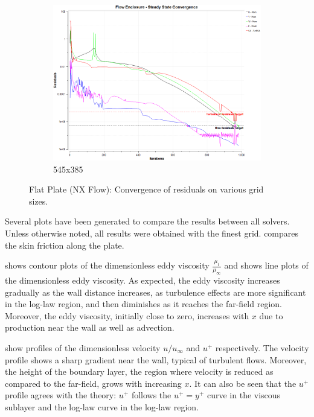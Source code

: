 \begin{figure}[ht!]
\begin{subfigure}{0.48\textwidth}
        \includegraphics[width=\textwidth]{./figs/flatnx/545x385_conv.png}
        \caption{545x385}
    \end{subfigure}
    \caption{Flat Plate (NX Flow): Convergence of residuals on various grid sizes.}
    \label{fig:nxflatcnvstudy}
\end{figure}

Several plots have been generated to compare the results between all solvers. Unless otherwise noted, all results were obtained with the finest grid.  compares the skin friction along the plate.

 shows contour plots of the dimensionless eddy viscosity $\frac{\mu_t}{\mu_{\infty}}$ and  shows line plots of the dimensionless eddy viscosity. As expected, the eddy viscosity increases gradually as the wall distance increases, as turbulence effects are more significant in the log-law region, and then diminishes as it reaches the far-field region. Moreover, the eddy viscosity, initially close to zero, increases with $x$ due to production near the wall as well as advection.

 show profiles of the dimensionless velocity $u/u_\infty$ and $u^+$ respectively. The velocity profile shows a sharp gradient near the wall, typical of turbulent flows. Moreover, the height of the boundary layer, the region where velocity is reduced as compared to the far-field, grows with increasing $x$. It can also be seen that the $u^+$ profile agrees with the theory: $u^+$ follows the $u^+=y^+$ curve in the viscous sublayer and the log-law curve in the log-law region.

